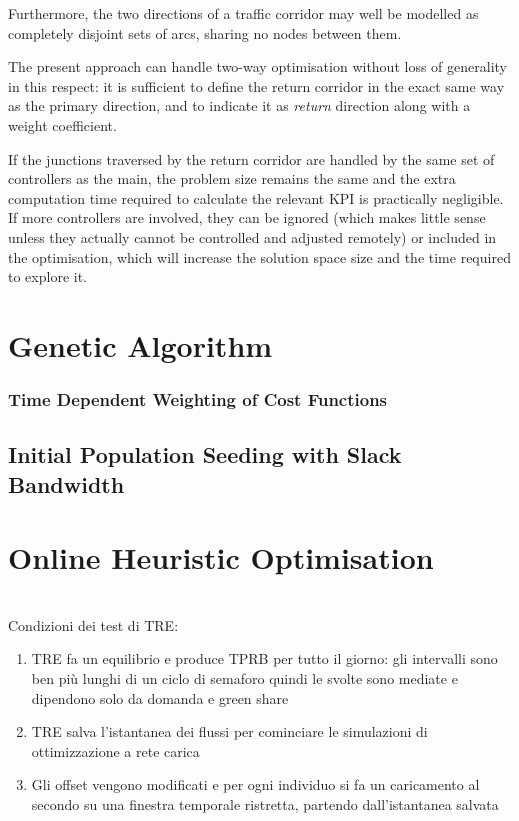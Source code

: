 Furthermore, the two directions of a traffic corridor may well be modelled as completely disjoint sets of arcs, sharing no nodes between them.

The present approach can handle two-way optimisation without loss of generality in this respect: it is sufficient to define the return corridor in the exact same way as the primary direction, and to indicate it as \emph{return} direction along with a weight coefficient.

If the junctions traversed by the return corridor are handled by the same set of controllers as the main, the problem size remains the same and the extra computation time required to calculate the relevant KPI is practically negligible. If more controllers are involved, they can be ignored (which makes little sense unless they actually cannot be controlled and adjusted remotely) or included in the optimisation, which will increase the solution space size and the time required to explore it.


\section{Genetic Algorithm} \label{s:geneticalgo}

\subsubsection*{Time Dependent Weighting of Cost Functions}



\subsection{Initial Population Seeding with Slack Bandwidth}



\section{Online Heuristic Optimisation}
\\
Condizioni dei test di TRE:
\begin{enumerate}
\item TRE fa un equilibrio e produce TPRB per tutto il giorno: gli intervalli sono ben più lunghi di un ciclo di semaforo quindi le svolte sono mediate e dipendono solo da domanda e green share
\item TRE salva l'istantanea dei flussi per cominciare le simulazioni di ottimizzazione a rete carica
\item Gli offset vengono modificati e per ogni individuo si fa un caricamento al secondo su una finestra temporale ristretta, partendo dall'istantanea salvata
\end{enumerate}

